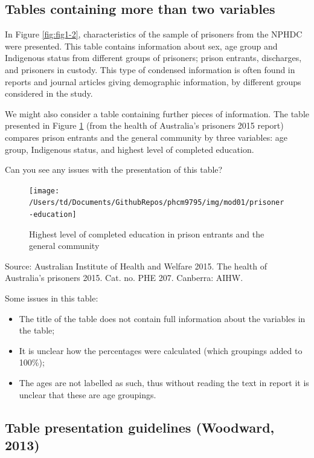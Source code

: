 \documentclass[
]{memoir}
\providecommand{\tightlist}{%
  \setlength{\itemsep}{0pt}\setlength{\parskip}{0pt}}
\begin{document}
\hypertarget{tables-containing-more-than-two-variables}{%
\subsection{Tables containing more than two variables}\label{tables-containing-more-than-two-variables}}

In Figure \ref{fig:fig1-2}, characteristics of the sample of prisoners from the NPHDC were presented. This table contains information about sex, age group and Indigenous status from different groups of prisoners; prison entrants, discharges, and prisoners in custody. This type of condensed information is often found in reports and journal articles giving demographic information, by different groups considered in the study.

We might also consider a table containing further pieces of information. The table presented in Figure \ref{fig:fig-prison-education} (from the health of Australia's prisoners 2015 report) compares prison entrants and the general community by three variables: age group, Indigenous status, and highest level of completed education.

Can you see any issues with the presentation of this table?

\begin{figure}[H]
\texttt{[image: /Users/td/Documents/GithubRepos/phcm9795/img/mod01/prisoner-education]} \caption{Highest level of completed education in prison entrants and the general community}\label{fig:fig-prison-education}
\end{figure}

Source: Australian Institute of Health and Welfare 2015. The health of Australia's prisoners 2015. Cat. no. PHE 207. Canberra: AIHW.

Some issues in this table:

\begin{itemize}
\tightlist
\item
  The title of the table does not contain full information about the variables in the table;
\item
  It is unclear how the percentages were calculated (which groupings added to 100\%);
\item
  The ages are not labelled as such, thus without reading the text in report it is unclear that these are age groupings.
\end{itemize}

\hypertarget{table-presentation-guidelines-woodward-2013}{%
\subsection{Table presentation guidelines (Woodward, 2013)}\label{table-presentation-guidelines-woodward-2013}}
\end{document}
